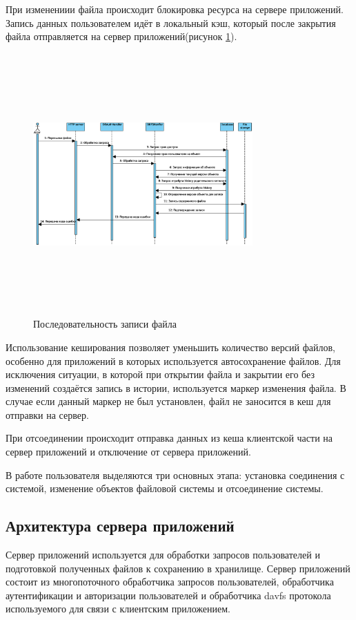 \documentclass[utf8,usehyperref,12pt]{G7-32}
\begin{document}
При изменениии файла происходит блокировка ресурса на сервере приложений. Запись данных пользователем идёт в локальный кэш, который после закрытия файла отправляется на сервер приложений(рисунок \ref{fig:put_sequence}). 

\begin{figure}[h!]
   \centering%
   \includegraphics[height=100mm, width=0.75\textwidth, clip, keepaspectratio]{pictures/put_seq}
   \caption{Последовательность записи файла}\label{fig:put_sequence}
 \end{figure}

Использование кеширования позволяет уменьшить количество версий файлов, особенно для приложений в которых используется автосохранение файлов. Для исключения ситуации, в которой при открытии файла и закрытии его без изменений создаётся запись в истории, используется маркер изменения файла. В случае если данный маркер не был установлен, файл не заносится в кеш для отправки на сервер.


При отсоединении происходит отправка данных из кеша клиентской части на сервер приложений и отключение от сервера приложений.

В работе пользователя выделяются три основных этапа: установка соединения с системой, изменение объектов файловой системы и отсоединение системы. 

\subsection{Архитектура сервера приложений}

Сервер приложений используется для обработки запросов пользователей и подготовкой полученных файлов к сохранению в хранилище. Сервер приложений состоит из многопоточного обработчика запросов пользователей, обработчика аутентификации и авторизации пользователей и обработчика davfs протокола используемого для связи с клиентским приложением.
\end{document}
